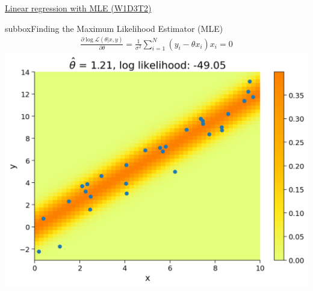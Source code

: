 \begin{textbox}{\href{https://compneuro.neuromatch.io/tutorials/W1D3_ModelFitting/student/W1D3_Tutorial2.html}{Linear regression with MLE (W1D3T2)}   }
\begin{subbox}{subbox}{Finding the Maximum Likelihood Estimator (MLE)}
\begin{align}
\frac{\partial\operatorname{log}\mathcal{L}(\theta|x,y)}{\partial\theta}=\frac{1}{\sigma^2}\sum_{i=1}^N(y_i-\theta x_i)x_i = 0
\end{align}
\centering
\includegraphics[scale=0.2]{Figures/ModelFitting/MFFigure2.png}
\end{subbox}
\end{textbox}
